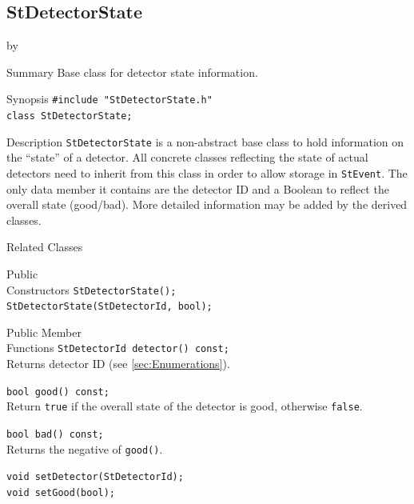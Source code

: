 \documentclass[twoside]{article}
\newcommand{\entrylabel}[1]{\mbox{\textbf{{#1}}}\hfil}%
\newenvironment{entry}
{\begin{list}{}%
    {\renewcommand{\makelabel}{\entrylabel}%
     \setlength{\labelwidth}{90pt}%
     \setlength{\leftmargin}{\labelwidth}
     \advance\leftmargin by \labelsep%
      }%
    }%
  {\end{list}}
\newcommand{\Entrylabel}[1]%
{\raisebox{0pt}[1ex][0pt]{\makebox[\labelwidth][l]%
    {\parbox[t]{\labelwidth}{\hspace{0pt}\textbf{{#1}}}}}}
\newenvironment{Entry}%
{\renewcommand{\entrylabel}{\Entrylabel}\begin{entry}}%
  {\end{entry}}
\begin{document}
\subsection{StDetectorState}
 
\label{sec:StDetectorState}
\begin{Entry}
\item[Summary] Base class for detector state information.
\item[Synopsis]
    \verb+#include "StDetectorState.h"+\\
    \verb+class StDetectorState;+\\
\item[Description]
    \texttt{StDetectorState} is a non-abstract base class to hold information
    on the ``state'' of a detector. All concrete classes reflecting the state
    of actual detectors need to inherit from this class in order to allow
    storage in \texttt{StEvent}. The only data member it contains are the detector ID
    and a Boolean to reflect the overall state (good/bad). More detailed
    information may be added by the derived classes.
    
\item[Related Classes]
\item[Public\\ Constructors]
    \verb+StDetectorState();+\\
    \verb+StDetectorState(StDetectorId, bool);+\\
    
\item[Public Member\\ Functions]
    \verb+StDetectorId detector() const;+\\
    Returns detector ID (see \ref{sec:Enumerations}).
    
    \verb+bool good() const;+\\
    Return \texttt{true} if the overall state of the detector is good, otherwise \texttt{false}.
    
    \verb+bool bad() const;+\\
    Returns the negative of \texttt{good()}.
    
    \verb+void setDetector(StDetectorId);+\\
    \verb+void setGood(bool);+\\
\end{Entry}
\clearpage
\end{document}
